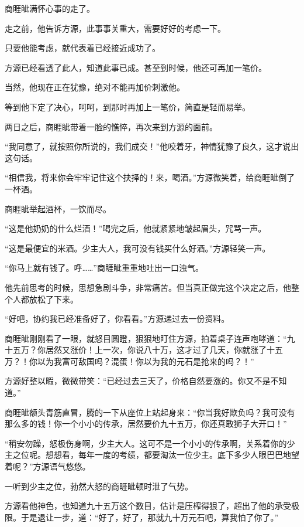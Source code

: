 
\begin{this_body}

商睚眦满怀心事的走了。

走之前，他告诉方源，此事事关重大，需要好好的考虑一下。

只要他能考虑，就代表着已经接近成功了。

方源已经看透了此人，知道此事已成。甚至到时候，他还可再加一笔价。

当然，他现在正在犹豫，绝对不能再加价刺激他。

等到他下定了决心，呵呵，到那时再加上一笔价，简直是轻而易举。

两日之后，商睚眦带着一脸的憔悴，再次来到方源的面前。

“我同意了，就按照你所说的，我们成交！”他咬着牙，神情犹豫了良久，这才说出这句话。

“相信我，将来你会牢牢记住这个抉择的！来，喝酒。”方源微笑着，给商睚眦倒了一杯酒。

商睚眦举起酒杯，一饮而尽。

“这是他奶奶的什么烂酒！”喝完之后，他就紧紧地皱起眉头，咒骂一声。

“这是最便宜的米酒。少主大人，我可没有钱买什么好酒。”方源轻笑一声。

“你马上就有钱了。呼……”商睚眦重重地吐出一口浊气。

他先前思考的时候，思想急剧斗争，非常痛苦。但当真正做完这个决定之后，他整个人都放松了下来。

“好吧，协约我已经准备好了，你看看。”方源递过去一份资料。

商睚眦刚刚看了一眼，就怒目圆瞪，狠狠地盯住方源，拍着桌子连声咆哮道：“九十五万？你居然又涨价！上一次，你说八十万，这才过了几天，你就涨了十五万？！你以为我富可敌国吗？混蛋！你以为我的元石是抢来的吗？！”

方源好整以暇，微微带笑：“已经过去三天了，价格自然要涨的。你又不是不知道。”

商睚眦额头青筋直冒，腾的一下从座位上站起身来：“你当我好欺负吗？我可没有那么多的钱！你一个小小的传承，居然要价九十五万，你还真敢狮子大开口！”

“稍安勿躁，怒极伤身啊，少主大人。这可不是一个小小的传承啊，关系着你的少主之位呢。想想看，每年一度的考绩，都要淘汰一位少主。底下多少人眼巴巴地望着呢？”方源语气悠悠。

一听到少主之位，勃然大怒的商睚眦顿时泄了气势。

方源看他神色，也知道九十五万这个数目，估计是压榨得狠了，超出了他的承受极限。于是退让一步，道：“好了，好了，那就九十万元石吧，算我怕了你了。”


\end{this_body}
